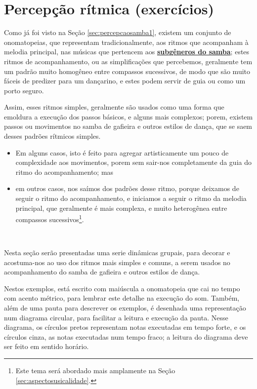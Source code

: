\section{Percepção rítmica (exercícios)}



Como já foi visto na Seção \ref{sec:percepcaosamba1},
existem um conjunto de onomatopeias, que representam  tradicionalmente,
aos ritmos  que acompanham à melodia principal, 
nas músicas que pertencem aos \hyperref[sec:FamiliaSamba]{\textbf{subgêneros do samba}};
estes ritmos de acompanhamento, ou as simplificações que percebemos, 
geralmente tem um padrão muito homogêneo entre compassos sucessivos,
de modo que são muito fáceis de predizer para um dançarino, 
e estes podem servir de guia ou como um porto seguro.

Assim, esses ritmos simples, geralmente são usados como uma forma que emoldura a execução dos passos básicos,
e alguns mais complexos;
porem, existem passos ou movimentos no samba de gafieira e outros estilos de dança,
que se saem desses padrões rítmicos simples. 
\begin{itemize}
\item Em alguns casos,
isto é feito para agregar artisticamente um pouco de complexidade aos movimentos,
porem sem sair-nos completamente da guia do ritmo do acompanhamento; mas 
\item em outros casos, nos saímos dos padrões desse ritmo, 
porque deixamos de seguir o ritmo do acompanhamento,
e iniciamos a seguir o ritmo da melodia principal, que geralmente é mais complexa,
e muito heterogênea entre compassos sucessivos\footnote{Este 
tema será abordado mais amplamente na Seção \ref{sec:aspectosusicalidade}.}. 
\end{itemize}~


Nesta seção serão presentadas uma serie dinâmicas grupais, 
para decorar e acostuma-nos ao uso dos ritmos mais simples e comuns, 
a serem usados no acompanhamento do samba de gafieira e outros estilos de dança.

Nestos exemplos, está escrito com maiúscula a onomatopeia 
que cai no tempo com acento métrico, para lembrar este detalhe na execução do som. 
Também, além de uma pauta para descrever os exemplos, 
é desenhada uma representação num diagrama circular,
para facilitar a leitura e execução da pauta.
Nesse diagrama, os círculos pretos representam notas executadas em tempo forte,
e os círculos cinza, as notas executadas num tempo fraco;
a leitura do diagrama deve ser feito em sentido horário.  

